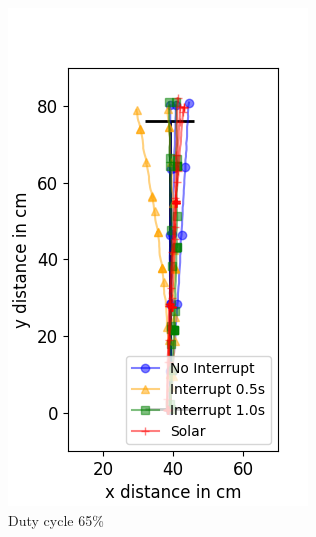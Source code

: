 \begin{figure}
\begin{subfigure}[b]{0.32\textwidth}
		\includegraphics[width=\textwidth]{pics/straight_65.png}
		\caption{Duty cycle 65\%}
		\label{fig:stra_exp2}
	\end{subfigure}
	\begin{subfigure}[b]{0.32\textwidth}

\end{subfigure}
\end{figure}
